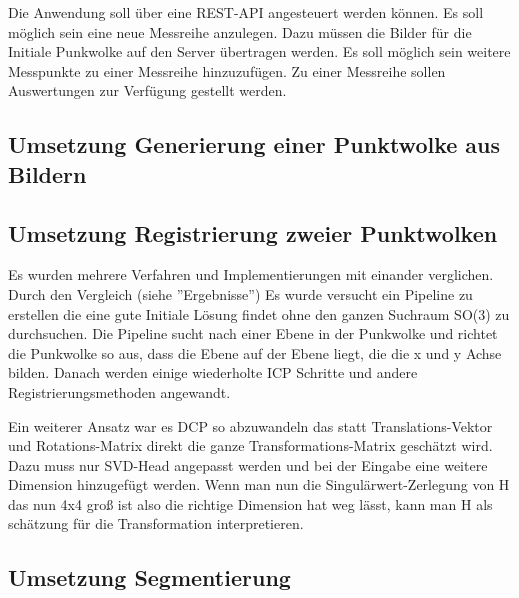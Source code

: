 \documentclass[12pt,titlepage]{article}
\begin{document}
Die Anwendung soll über eine REST-API angesteuert werden können. Es soll möglich sein eine neue Messreihe anzulegen. Dazu müssen die Bilder für die Initiale Punkwolke auf den Server übertragen werden. 
Es soll möglich sein weitere Messpunkte zu einer Messreihe hinzuzufügen. Zu einer Messreihe sollen Auswertungen zur Verfügung gestellt werden. 

\subsection{Umsetzung Generierung einer Punktwolke aus Bildern}
\label{sec:realisierung:implementierung1}

\subsection{Umsetzung Registrierung zweier Punktwolken}
\label{sec:realisierung:implementierung2}

Es wurden mehrere Verfahren und Implementierungen mit einander verglichen. Durch den Vergleich (siehe ''Ergebnisse'') Es wurde versucht ein Pipeline zu erstellen die eine gute Initiale Lösung findet ohne den ganzen Suchraum SO(3) zu durchsuchen.
Die Pipeline sucht nach einer Ebene in der Punkwolke und richtet die Punkwolke so aus, dass die Ebene auf der Ebene liegt, die die x und y Achse bilden. Danach werden einige wiederholte ICP Schritte und andere Registrierungsmethoden angewandt.

Ein weiterer Ansatz war es DCP so abzuwandeln das statt Translations-Vektor und Rotations-Matrix direkt die ganze Transformations-Matrix geschätzt wird. Dazu muss nur SVD-Head angepasst werden 
und bei der Eingabe eine weitere Dimension hinzugefügt werden. Wenn man nun die Singulärwert-Zerlegung von H das nun 4x4 groß ist also die richtige Dimension hat weg lässt, kann man H als schätzung für die Transformation interpretieren.


\subsection{Umsetzung Segmentierung}
\label{sec:realisierung:implementierung2}
\end{document}
